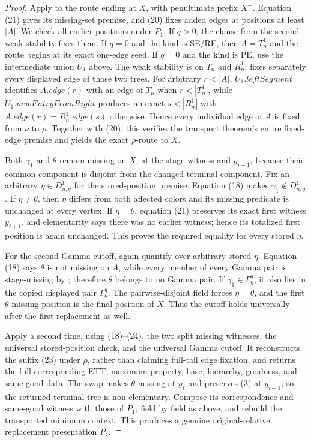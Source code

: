 \begin{proof}
Apply  to the
route ending at \(X\), with penultimate prefix \(X^-\).  Equation (21)
gives its missing-set premise, and (20) fixes added edges at positions at
least \(|A|\).  We check all earlier positions under \(P_1\).  If
\(q>0\), the  clause from the second weak
stability fixes them.  If \(q=0\) and the kind is SE/RE, then
\(A=T_n^1\) and the route begins at its exact one-edge seed.  If \(q=0\)
and the kind is PE, use the intermediate union \(U_1\) above.  The weak
stability is  on \(T_n^1\) and
\(R_n^1\);  fixes separately
every displayed edge of those two trees.  For arbitrary \(r<|A|\),
\(U_1.\mathit{leftSegment}\) identifies
\(A.\mathit{edge}(r)\) with an edge of \(T_n^1\) when
\(r<|T_n^1|\), while \(U_1.\mathit{newEntryFromRight}\) produces an
exact \(s<|R_n^1|\) with
\(A.\mathit{edge}(r)=R_n^1.\mathit{edge}(s)\) otherwise.  Hence every
individual edge of \(A\) is fixed from \(\nu\) to \(\rho\).  Together
with (20), this verifies the transport theorem's entire fixed-edge
premise and yields the exact \(\rho\)-route to \(X\).                \(\tag{24}\)

Both \(\gamma_1\) and \(\theta\) remain missing on \(X\), at the stage
witness and \(y_{i+1}\), because their common component is disjoint from
the changed terminal component.  Fix an arbitrary
\(\eta\in D^1_{n,q}\) for the stored-position premise.  Equation (18)
makes \(\gamma_1\notin D^1_{n,q}\).  If \(\eta\ne\theta\), then \(\eta\)
differs from both affected colors and its missing predicate is unchanged
at every vertex.  If \(\eta=\theta\), equation (21) preserves its exact
first witness \(y_{i+1}\), and elementarity says there was no earlier
witness; hence its totalized first position is again unchanged.  This
proves the required equality for every stored \(\eta\).

For the second Gamma cutoff, again quantify over arbitrary stored
\(\eta\).  Equation (18) says \(\theta\) is not missing on \(A\), while
every member of every Gamma pair is stage-missing by
; therefore \(\theta\) belongs to no Gamma pair.
If \(\gamma_1\in\Gamma^q_\eta\), it also lies in the copied displayed
pair \(\Gamma^q_\theta\).  The pairwise-disjoint field forces
\(\eta=\theta\), and the first \(\theta\)-missing position is the final
position of \(X\).  Thus the cutoff holds universally after the first
replacement as well.

Apply  a second time, using
(18)--(24), the two split missing witnesses, the universal stored-position
check, and the universal Gamma cutoff.  It reconstructs the suffix (23)
under \(\rho\), rather than claiming full-tail edge fixation, and returns
the full corresponding ETT, maximum property, base, hierarchy, goodness,
and same-good data.  The swap makes \(\theta\) missing at \(y_\ell\) and
preserves (3) at \(y_{i+1}\), so the returned terminal tree is
non-elementary.  Compose its correspondence and same-good witness with
those of \(P_1\), field by field as above, and rebuild the transported
minimum context.  This produces a genuine original-relative replacement
presentation \(P_2\).


\end{proof}
